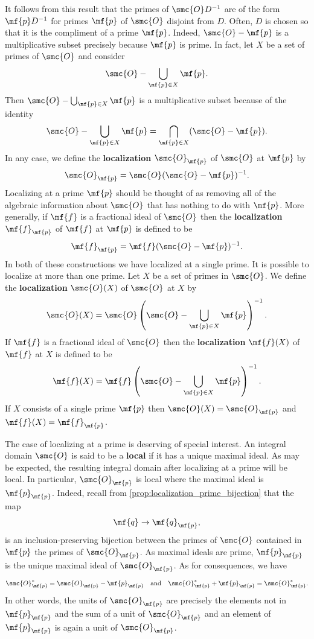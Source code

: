 \documentclass[12pt]{article}
\begin{document}
      It follows from this result that the primes of \(\smc{O}D^{-1}\) are of the form \(\mf{p}D^{-1}\) for primes \(\mf{p}\) of \(\smc{O}\) disjoint from \(D\). Often, \(D\) is chosen so that it is the compliment of a prime \(\mf{p}\). Indeed, \(\smc{O}-\mf{p}\) is a multiplicative subset precisely because \(\mf{p}\) is prime. In fact, let \(X\) be a set of primes of \(\smc{O}\) and consider
      \[
        \smc{O}-\bigcup_{\mf{p} \in X}\mf{p}.
      \]
      Then \(\smc{O}-\bigcup_{\mf{p} \in X}\mf{p}\) is a multiplicative subset because of the identity
      \[
        \smc{O}-\bigcup_{\mf{p} \in X}\mf{p} = \bigcap_{\mf{p} \in X}(\smc{O}-\mf{p}).
      \]
      In any case, we define the \textbf{localization} \(\smc{O}_{\mf{p}}\) of \(\smc{O}\) at \(\mf{p}\) by
      \[
        \smc{O}_{\mf{p}} = \smc{O}(\smc{O}-\mf{p})^{-1}.
      \]
      Localizing at a prime \(\mf{p}\) should be thought of as removing all of the algebraic information about \(\smc{O}\) that has nothing to do with \(\mf{p}\). More generally, if \(\mf{f}\) is a fractional ideal of \(\smc{O}\) then the \textbf{localization} \(\mf{f}_{\mf{p}}\) of \(\mf{f}\) at \(\mf{p}\) is defined to be
      \[
        \mf{f}_{\mf{p}} = \mf{f}(\smc{O}-\mf{p})^{-1}.
      \]
      In both of these constructions we have localized at a single prime. It is possible to localize at more than one prime. Let \(X\) be a set of primes in \(\smc{O}\). We define the \textbf{localization} \(\smc{O}(X)\) of \(\smc{O}\) at \(X\) by
      \[
        \smc{O}(X) = \smc{O}\left(\smc{O}-\bigcup_{\mf{p} \in X}\mf{p}\right)^{-1}.
      \]
      If \(\mf{f}\) is a fractional ideal of \(\smc{O}\) then the \textbf{localization} \(\mf{f}(X)\) of \(\mf{f}\) at \(X\) is defined to be
      \[
        \mf{f}(X) = \mf{f}\left(\smc{O}-\bigcup_{\mf{p} \in X}\mf{p}\right)^{-1}.
      \]
      If \(X\) consists of a single prime \(\mf{p}\) then \(\smc{O}(X) = \smc{O}_{\mf{p}}\) and \(\mf{f}(X) = \mf{f}_{\mf{p}}\).

      The case of localizing at a prime is deserving of special interest. An integral domain \(\smc{O}\) is said to be a \textbf{local} if it has a unique maximal ideal. As may be expected, the resulting integral domain after localizing at a prime will be local. In particular, \(\smc{O}_{\mf{p}}\) is local where the maximal ideal is \(\mf{p}_{\mf{p}}\). Indeed, recall from \cref{prop:localization_prime_bijection} that the map
      \[
        \mf{q} \to \mf{q}_{\mf{p}},
      \]
      is an inclusion-preserving bijection between the primes of \(\smc{O}\) contained in \(\mf{p}\) the primes of \(\smc{O}_{\mf{p}}\). As maximal ideals are prime, \(\mf{p}_{\mf{p}}\) is the unique maximal ideal of \(\smc{O}_{\mf{p}}\). As for consequences, we have
      \[
        \smc{O}_{\mf{p}}^{\ast} = \smc{O}_{\mf{p}}-\mf{p}_{\mf{p}} \quad \text{and} \quad \smc{O}_{\mf{p}}^{\ast}+\mf{p}_{\mf{p}} = \smc{O}_{\mf{p}}^{\ast}.
      \]
      In other words, the units of \(\smc{O}_{\mf{p}}\) are precisely the elements not in \(\mf{p}_{\mf{p}}\) and the sum of a unit of \(\smc{O}_{\mf{p}}\) and an element of \(\mf{p}_{\mf{p}}\) is again a unit of \(\smc{O}_{\mf{p}}\).
\end{document}
